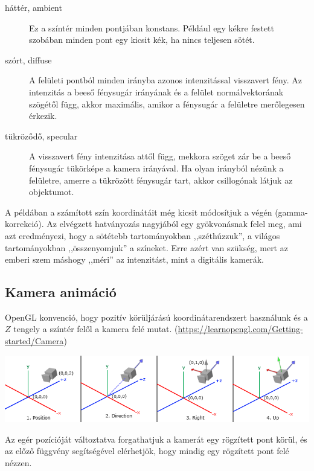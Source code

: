 \begin{description}
  \item[háttér, ambient] Ez a színtér minden pontjában konstans. Például egy kékre festett szobában
  minden pont egy kicsit kék, ha nincs teljesen sötét.
  \item[szórt, diffuse] A felületi pontból minden irányba azonos intenzitással visszavert fény. Az
  intenzitás a beeső fénysugár irányának és a felület normálvektorának szögétől függ,
  akkor maximális, amikor a fénysugár a felületre merőlegesen érkezik.
  \item[tükröződő, specular] A visszavert fény intenzitása attől függ, mekkora szöget zár be
  a beeső fénysugár tükörképe a kamera irányával. Ha olyan irányból nézünk a felületre, amerre
  a tükrözött fénysugár tart, akkor csillogónak látjuk az objektumot.
\end{description} 


A példában a számított szín koordinátáit még kicsit módosítjuk a végén (gamma-korrekció).
Az elvégzett hatványozás nagyjából egy gyökvonásnak felel meg, ami azt eredményezi, hogy
a sötétebb tartományokban ,,széthúzzuk'', a világos tartományokban ,,összenyomjuk''
a színeket. Erre azért van szükség, mert az emberi szem máshogy ,,méri'' az intenzitást, mint
a digitális kamerák. 

\subsection{Kamera animáció}

OpenGL konvenció, hogy pozitív körüljárású koordinátarendszert használunk és a $Z$ tengely
a színtér felől a kamera felé mutat.
(\url{https://learnopengl.com/Getting-started/Camera})

\begin{center}
\includegraphics[width=16cm]{images/camera_axes.png}
\end{center}


Az egér pozícióját változtatva forgathatjuk a kamerát egy rögzített pont körül,
és az előző függvény segítségével elérhetjök, hogy mindig egy rögzített pont felé nézzen.



